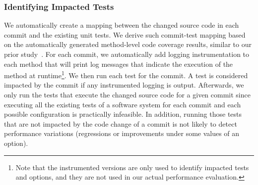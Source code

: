 \subsubsection{Identifying Impacted Tests}
\label{sec:impactedtests}
We automatically create a mapping between the changed source code in each commit and the existing unit tests. %
We derive such commit-test mapping based on the automatically generated method-level code coverage results, similar to our prior study~\cite{jinfu_tse2020}. %
For each commit, we automatically add logging instrumentation to each method that will print log messages that indicate the execution of the method at runtime\footnote{Note that the instrumented versions are only used to identify impacted tests and options, and they are not used in our actual performance evaluation.}.
We then run each test for the commit. A test is considered impacted by the commit if any instrumented logging is output.
Afterwards, we only run the tests that execute the changed source code for a given commit since executing all the existing tests of a software system for each commit and each possible configuration is practically infeasible. In addition, running those tests that are not impacted by the code change of a commit is not likely to detect performance variations (regressions or improvements under some values of an option). 


